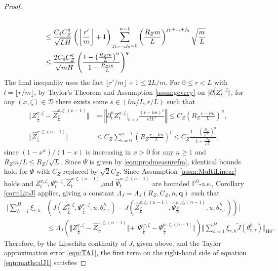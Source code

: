 \documentclass{article}
\begin{document}
\begin{appendices}
\begin{proof}
\begin{align}
\notag\\
&\le\frac{C_4 C_Z^{q}}{\sqrt{LH}}\left(\left\lfloor\frac{r'}{m}\right\rfloor+1\right)\sum_{j_1,\ldots,j_q=0}^{n-1}\left(\frac{R_Z m}{L}\right)^{j_1+\ldots+j_q}\sqrt{ \frac{m}{L} }\notag
\\
    & \le \frac{2 C_4 C_Z^{q}}{\sqrt{mH}} \left(\frac{1-\left(\frac{R_Z m}{L} \right)^{n}}{1-\frac{R_Z m}{L}} \right)^{q}.\label{eqn:bound_mathcalJ1_1}
\end{align}
The final inequality uses the fact $\lfloor r'/m\rfloor+1\le 2L/m$. For $0\le r< L$ with $l = \lfloor r/m\rfloor$, by Taylor's Theorem and Assumption \ref{assm:gevrey} on $\Vert \partial_t^j Z_t^{x,\zeta}\Vert$,  for any $(x,\zeta ) \in \mathscr D $ there exists some $s\in (lm/L,r/L)$ such that
\begin{align}\label{eqn:TA1}
    \Vert Z^{x,\zeta}_{\frac{r}{L}}-\hat Z^{x,\zeta,(n-1)}_{\frac{r}{L}} \Vert  &= \left\Vert \partial_t^{n}Z_t^{x,\zeta}|_{t=s}\frac{(r-lm)^n}{n!L^n}\right\Vert\le C_Z \left(R_Z \frac{r-lm}{L} \right)^n, \\ \Vert \hat Z^{x,\zeta ,(n-1)}_\frac{r}{L}\Vert &\le C_Z\sum_{i=0}^{n-1}\left(R_Z \frac{r-lm}{L} \right)^i\le C_Z\frac{1- \left(  \frac{R_Z}{\sqrt{L}}\right)^{n}}{1- \frac{R_Z}{\sqrt{L}}} ,\label{eqn:TA2}
\end{align}
since $(1-x^n)/(1-x)$ is increasing in $x>0$ for any $n\ge 1$ and $R_Zm/L\le R_Z/\sqrt{L}$. Since $\Psi$ is given by \eqref{eqn:prodmeasurefm}, identical bounds hold for $\Psi$ with $C_Z$ replaced by $\sqrt{2}C_Z$. Since Assumption \ref{assm:MultiLinear} holds and $ Z^{x,\zeta}_t ,\Psi^{w,\zeta}_t,\hat Z^{x,\zeta,(n-1)}_t$,and $\hat \Psi^{w,\zeta,(n-1)}_t$ are bounded $\mathbb P^0$-a.s., Corollary \ref{corr:LipJ} applies, giving a constant $\Lambda_J= \Lambda_J(R_Z,C_Z,n,\bm q)$ such that
\begin{align*}
    \Bigg\vert\sum_{h=1}^H \xi_{r,h}&\left(J(Z^{x,\zeta}_{\frac{r}{L}},\Psi^{w,\zeta}_{\frac{r}{L}},u,\theta^h_{r,\tau})-J(\hat Z^{x,\zeta,(n-1)}_\frac{r}{L},\hat \Psi^{w,\zeta, (n-1)}_\frac{r}{L},u,\theta^h_{r,\tau})\right)\Bigg\vert\\&\le \Lambda_J \left(\Vert Z^{x,\zeta}_{\frac{r}{L}}-\hat Z^{x,\zeta,(n-1)}_{\frac{r}{L}}\Vert + \Vert \Psi^{w,\zeta}_{\frac{r}{L}}-\Psi^{w,\zeta,(n-1)}_{\frac{r}{L}}\Vert\right)\Bigg\Vert \sum_{h=1}^H \xi_{r,h}\widetilde J\left(\theta^h_{r,\tau}\right)\Bigg\Vert_\mathrm{HS}.
\end{align*}
Therefore, by the Lipschitz continuity of $J$, given above, and the Taylor approximation error \eqref{eqn:TA1}, the first term on the right-hand side of equation \eqref{eqn:mathcalJ1} satisfies

\end{proof}
\end{appendices}
\end{document}
